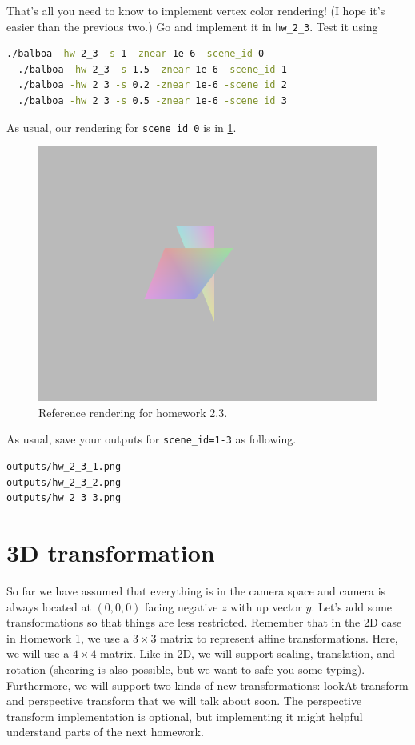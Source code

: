 That's all you need to know to implement vertex color rendering! (I hope it's easier than the previous two.) Go and implement it in \lstinline{hw_2_3}. Test it using
\begin{lstlisting}[language=bash]
  ./balboa -hw 2_3 -s 1 -znear 1e-6 -scene_id 0
  ./balboa -hw 2_3 -s 1.5 -znear 1e-6 -scene_id 1
  ./balboa -hw 2_3 -s 0.2 -znear 1e-6 -scene_id 2
  ./balboa -hw 2_3 -s 0.5 -znear 1e-6 -scene_id 3
\end{lstlisting}

As usual, our rendering for \lstinline{scene_id 0} is in \cref{fig:hw2_3}.
\begin{figure}[h]
    \centering
    \includegraphics[width=0.5\linewidth]{imgs/hw_2_3.png}
    \caption{Reference rendering for homework 2.3.}
    \label{fig:hw2_3}
\end{figure}

As usual, save your outputs for \lstinline{scene_id=1-3} as following.
\begin{lstlisting}[language=bash]
outputs/hw_2_3_1.png
outputs/hw_2_3_2.png
outputs/hw_2_3_3.png
\end{lstlisting}

\section{3D transformation}

So far we have assumed that everything is in the camera space and camera is always located at $(0, 0, 0)$ facing negative $z$ with up vector $y$. Let's add some transformations so that things are less restricted. Remember that in the 2D case in Homework 1, we use a $3 \times 3$ matrix to represent affine transformations. Here, we will use a $4 \times 4$ matrix. Like in 2D, we will support scaling, translation, and rotation (shearing is also possible, but we want to safe you some typing). Furthermore, we will support two kinds of new transformations: lookAt transform and perspective transform that we will talk about soon. The perspective transform implementation is optional, but implementing it might helpful understand parts of the next homework.

